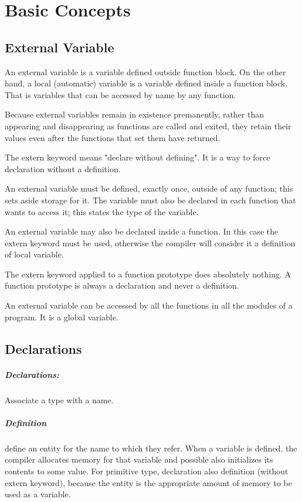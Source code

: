 \documentclass[11pt, a4paper]{book}
\begin{document}
\chapter{Basic Concepts}
\section{External Variable}
An external variable is a variable defined outside function block. On the other
hand, a local (automatic) variable is a variable defined inside a function block. That is variables that can be accessed by name by any function.

Because external variables remain in existence premanently, rather than appearing and disappearing as functions are called and exited, they retain their values even after the functions that set them have returned.

The extern keyword means "declare without defining". It is a way to force declaration without a definition.

An external variable must be defined, exactly once, outside of any function; this sets aside storage for it. The variable must also be declared in each function that wants to access it; this states the type of the variable.

An external variable may also be declared inside a function. In this case the extern keyword must be used, otherwise the compiler will consider it a definition of local variable.

The extern keyword applied to a function prototype does absolutely nothing. A function prototype is always a declaration and never a definition.

An external variable can be accessed by all the functions in all the modules of a program. It is a global variable.
\section{Declarations}
\paragraph{Declarations:} Associate a type with a name.
\paragraph{Definition} define an entity for the name to which they refer. When a variable is defined, the compiler allocates memory for that variable and possible also initializes its contents to some value.
For primitive type, declaration also definition (without extern keyword), because the entity is the appropriate amount of memory to be used as a variable.
\end{document}
